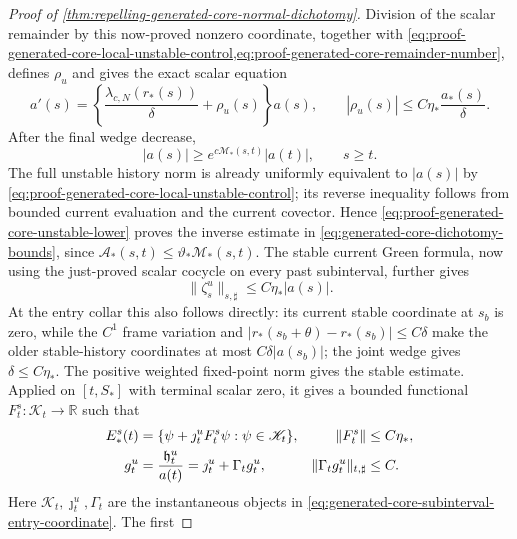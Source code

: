 \begin{proof}[Proof of
\cref{thm:repelling-generated-core-normal-dichotomy}]
Division of the scalar remainder by this now-proved nonzero coordinate,
together with
\cref{eq:proof-generated-core-local-unstable-control,eq:proof-generated-core-remainder-number},
defines \(\rho_u\) and gives the exact scalar equation
\begin{equation}
 a'(s)=\left\{\frac{\lambda_{c,N}(r_*(s))}{\delta}
                  +\rho_u(s)\right\}a(s),
 \qquad
 |\rho_u(s)|
 \le C\eta_*
       \frac{a_*(s)}{\delta}.                  \label{eq:proof-generated-core-unstable-amplitude}
\end{equation}
After the final wedge decrease,
\begin{equation}
 |a(s)|\ge
 e^{c\mathscr M_*(s,t)}|a(t)|,\qquad s\ge t.   \label{eq:proof-generated-core-unstable-lower}
\end{equation}
The full unstable history norm is already uniformly equivalent to
\(|a(s)|\) by
\cref{eq:proof-generated-core-local-unstable-control}; its reverse
inequality follows from bounded current evaluation and the current
covector.  Hence
\cref{eq:proof-generated-core-unstable-lower} proves the inverse estimate
in \cref{eq:generated-core-dichotomy-bounds}, since
\(\mathscr A_*(s,t)\le\vartheta_*\mathscr M_*(s,t)\).
The stable current Green formula, now using the just-proved scalar
cocycle on every past subinterval, further gives
\begin{equation}
 \|\zeta_s^u\|_{s,\sharp}
 \le C\eta_*|a(s)|.                            \label{eq:proof-generated-core-unstable-stable-graph}
\end{equation}
At the entry collar this also follows directly: its current stable
coordinate at \(s_b\) is zero, while the \(C^1\) frame variation and
\(|r_*(s_b+\theta)-r_*(s_b)|\le C\delta\) make the older stable-history
coordinates at most \(C\delta|a(s_b)|\); the joint wedge gives
\(\delta\le C\eta_*\).
The positive weighted fixed-point norm gives the stable estimate.  Applied
on \([t,S_*]\) with terminal scalar zero, it gives a bounded functional
\(F_t^s:\mathscr K_t\to\mathbb R\) such that
\begin{align}
 E_*^s(t)
 &=\{\psi+\jmath_t^uF_t^s\psi:\psi\in\mathscr K_t\},
 &\|F_t^s\|&\le C\eta_*,\notag\\
 g_t^u&=\frac{\mathfrak h_t^u}{a(t)}
       =\jmath_t^u+\Gamma_tg_t^u,
 &\|\Gamma_tg_t^u\|_{t,\sharp}&\le C .         \label{eq:proof-generated-core-two-graphs}
\end{align}
Here \(\mathscr K_t,\jmath_t^u,\Gamma_t\) are the instantaneous objects
in \cref{eq:generated-core-subinterval-entry-coordinate}.  The first

\end{proof}
